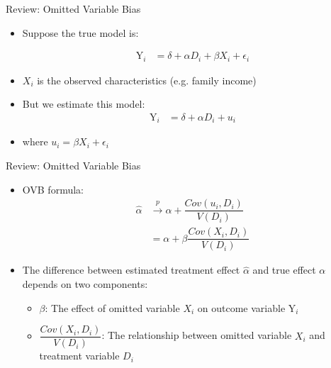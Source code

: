 \documentclass[dvipsnames,hyperref={pdfpagelabels=false}]{beamer}
\begin{document}
\begin{frame}{Review: Omitted Variable Bias}
	
	\begin{itemize}
		\item Suppose the true model is:
		
		\begin{align*}
		\mathrm{Y}_i &= \delta + \alpha D_i + \beta X_{i} + \epsilon_{i}
		\end{align*}
		
		\vspace{0.3cm}
		\item $X_{i}$ is the observed characteristics (e.g. family income)
		\vspace{0.3cm}
		\item But we estimate this model:
		\begin{align*}
		\mathrm{Y}_i &= \delta + \alpha D_i + u_i	
		\end{align*}
		\item where $u_i = \beta X_{i} + \epsilon_{i}$
		
	\end{itemize}
	
\end{frame}



\begin{frame}{Review: Omitted Variable Bias}
	
	\begin{itemize}
		
		
		\item OVB formula: 
		\begin{equation*}
		\begin{aligned}
		\hat{\alpha} &\overset{p}{\rightarrow} \alpha + \dfrac{Cov(u_{i},D_{i})}{V(D_{i})}  \\	
		&= \alpha + \beta \dfrac{Cov(X_{i},D_{i})}{V(D_{i})}
		\end{aligned}	
		\end{equation*}
		\item The difference between estimated treatment effect $\hat{\alpha}$ and true effect $\alpha$ depends on two components:
		\vspace{0.3cm}
		\begin{itemize}
			\item[1] $\beta$: The effect of omitted variable $X_{i}$ on outcome variable $\mathrm{Y}_{i}$ 
			\vspace{0.3cm}
			\item[2] $\dfrac{Cov(X_{i},D_{i})}{V(D_{i})}$: The relationship between omitted variable $X_{i}$ and treatment variable $D_{i}$ 
			
			
		\end{itemize}
		
	\end{itemize}
	
\end{frame}
\end{document}
